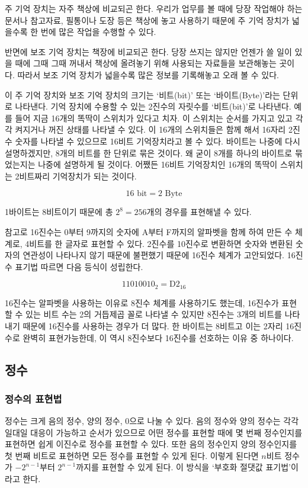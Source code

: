 \documentclass{article}
\begin{document}
주 기억 장치는 자주 책상에 비교되곤 한다. 우리가 업무를 볼 때에 당장 작업해야 하는 문서나
참고자료, 필통이나 도장 등은 책상에 놓고 사용하기 때문에 주 기억 장치가 넓을수록 한 번에 많은
작업을 수행할 수 있다.

반면에 보조 기억 장치는 책장에 비교되곤 한다. 당장 쓰지는 않지만 언젠가 쓸 일이 있을 때에
그때 그때 꺼내서 책상에 올려놓기 위해 사용되는 자료들을 보관해놓는 곳이다. 따라서 보조 기억
장치가 넓을수록 많은 정보를 기록해놓고 오래 볼 수 있다.

이 주 기억 장치와 보조 기억 장치의 크기는 `비트(bit)' 또는 `바이트(Byte)'라는 단위로
나타낸다. 기억 장치에 수용할 수 있는 2진수의 자릿수를 `비트(bit)'로 나타낸다. 예를 들어
지금 16개의 똑딱이 스위치가 있다고 치자. 이 스위치는 순서를 가지고 있고 각각 켜지거나
꺼진 상태를 나타낼 수 있다. 이 16개의 스위치들은 함께 해서 16자리 2진수 숫자를 나타낼 수
있으므로 16비트 기억장치라고 볼 수 있다. 바이트는 나중에 다시 설명하겠지만, 8개의 비트를
한 단위로 묶은 것이다. 왜 굳이 8개를 하나의 바이트로 묶었는지는 나중에 설명하게 될 것이다.
어쨌든 16비트 기억장치인 16개의 똑딱이 스위치는 2비트짜리 기억장치가 되는 것이다.

$$
16 \text{ bit} = 2 \text{ Byte}
$$

1바이트는 8비트이기 때문에 총 $2^8 = 256$개의 경우를 표현해낼 수 있다.

참고로 16진수는 0부터 9까지의 숫자에 A부터 F까지의 알파벳을 함께 하여 만든 수 체계로,
4비트를 한 글자로 표현할 수 있다. 2진수를 10진수로 변환하면 숫자와 변환된 숫자의 연관성이
나타나지 않기 때문에 불편했기 때문에 16진수 체계가 고안되었다.
16진수 표기법 따르면 다음 등식이 성립한다.

$$
1101 0010_2 = \text{D2}_{16}
$$

16진수는 알파벳을 사용하는 이유로 8진수 체계를 사용하기도 했는데, 16진수가 표현할 수 있는
비트 수는 2의 거듭제곱 꼴로 나타낼 수 있지만 8진수는 3개의 비트를 나타내기 때문에 16진수를
사용하는 경우가 더 많다. 한 바이트는 8비트고 이는 2자리 16진수로 완벽히 표현가능한데, 이 역시
8진수보다 16진수를 선호하는 이유 중 하나이다.

\subsection{정수}

\subsubsection{정수의 표현법}

정수는 크게 음의 정수, 양의 정수, 0으로 나눌 수 있다. 음의 정수와 양의 정수는 각각 일대일
대응이 가능하고 순서가 있으므로 어떤 정수를 표현할 때에 몇 번째 정수인지를 표현하면 쉽게
이진수로 정수를 표현할 수 있다. 또한 음의 정수인지 양의 정수인지를 첫 번째 비트로 표현하면
모든 정수를 표현할 수 있게 된다. 이렇게 된다면 $n$비트 정수가 $-2^{n-1}$부터
$2^{n-1}$까지를 표현할 수 있게 된다. 이 방식을 `부호화 절댓값 표기법'이라고 한다.
\end{document}
